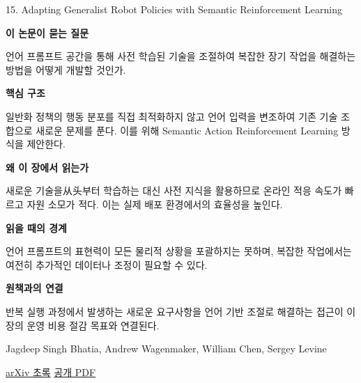 \documentclass[11pt,openany]{book}
\begin{document}
\begin{termcard}{15. Adapting Generalist Robot Policies with Semantic Reinforcement Learning}

\par

\medskip

{\sffamily\bfseries\color{deepblue} 이 논문이 묻는 질문}\par

언어 프롬프트 공간을 통해 사전 학습된 기술을 조절하여 복잡한 장기 작업을 해결하는 방법을 어떻게 개발할 것인가.

\smallskip

{\sffamily\bfseries\color{deepblue} 핵심 구조}\par

일반화 정책의 행동 분포를 직접 최적화하지 않고 언어 입력을 변조하여 기존 기술 조합으로 새로운 문제를 푼다. 이를 위해 Semantic Action Reinforcement Learning 방식을 제안한다.

\smallskip

{\sffamily\bfseries\color{deepblue} 왜 이 장에서 읽는가}\par

새로운 기술을从头부터 학습하는 대신 사전 지식을 활용하므로 온라인 적응 속도가 빠르고 자원 소모가 적다. 이는 실제 배포 환경에서의 효율성을 높인다.

\smallskip

{\sffamily\bfseries\color{coral} 읽을 때의 경계}\par

언어 프롬프트의 표현력이 모든 물리적 상황을 포괄하지는 못하며, 복잡한 작업에서는 여전히 추가적인 데이터나 조정이 필요할 수 있다.

\smallskip

{\sffamily\bfseries\color{teal} 원책과의 연결}\par

반복 실행 과정에서 발생하는 새로운 요구사항을 언어 기반 조절로 해결하는 접근이 이 장의 운영 비용 절감 목표와 연결된다.

\medskip

{\footnotesize\color{muted} Jagdeep Singh Bhatia, Andrew Wagenmaker, William Chen, Sergey Levine\par

\href{https://arxiv.org/abs/2606.31958}{arXiv 초록} \quad \href{https://arxiv.org/pdf/2606.31958}{공개 PDF}\par}

\end{termcard}
\end{document}
